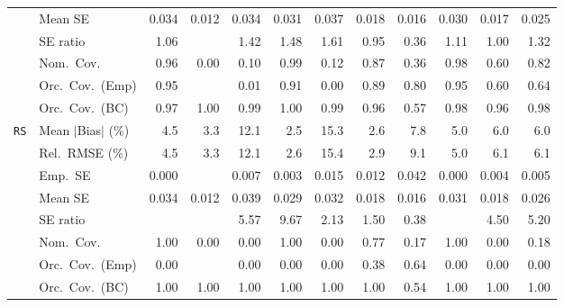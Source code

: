 \begin{landscape}
\begin{longtable}{llrrrrrrrrrr}
 & Mean SE & 0.034 & 0.012 & 0.034 & 0.031 & 0.037 & 0.018 & 0.016 & 0.030 & 0.017 & 0.025 \\
 & SE ratio & \cellcolor{rankthree}1.06 &  & 1.42 & 1.48 & 1.61 & \cellcolor{ranktwo}0.95 & 0.36 & 1.11 & \cellcolor{rankone}1.00 & 1.32 \\
 & Nom.\ Cov. & \cellcolor{rankone}0.96 & 0.00 & 0.10 & \cellcolor{rankthree}0.99 & 0.12 & 0.87 & 0.36 & \cellcolor{ranktwo}0.98 & 0.60 & 0.82 \\
 & Orc.\ Cov.\ (Emp) & \cellcolor{rankone}0.95 &  & 0.01 & \cellcolor{ranktwo}0.91 & 0.00 & \cellcolor{rankthree}0.89 & 0.80 & \cellcolor{rankone}0.95 & 0.60 & 0.64 \\
 & Orc.\ Cov.\ (BC) & \cellcolor{ranktwo}0.97 & 1.00 & 0.99 & 1.00 & 0.99 & \cellcolor{rankone}0.96 & 0.57 & \cellcolor{rankthree}0.98 & \cellcolor{rankone}0.96 & \cellcolor{rankthree}0.98 \\
\addlinespace[2pt]
\quad \texttt{RS} & Mean $|$Bias$|$ (\%) & 4.5 & \cellcolor{rankthree}3.3 & 12.1 & \cellcolor{rankone}2.5 & 15.3 & \cellcolor{ranktwo}2.6 & 7.8 & 5.0 & 6.0 & 6.0 \\
 & Rel.\ RMSE (\%) & 4.5 & \cellcolor{rankthree}3.3 & 12.1 & \cellcolor{rankone}2.6 & 15.4 & \cellcolor{ranktwo}2.9 & 9.1 & 5.0 & 6.1 & 6.1 \\
 & Emp.\ SE & 0.000 &  & 0.007 & 0.003 & 0.015 & 0.012 & 0.042 & 0.000 & 0.004 & 0.005 \\
 & Mean SE & 0.034 & 0.012 & 0.039 & 0.029 & 0.032 & 0.018 & 0.016 & 0.031 & 0.018 & 0.026 \\
 & SE ratio &  &  & 5.57 & 9.67 & \cellcolor{rankthree}2.13 & \cellcolor{rankone}1.50 & \cellcolor{ranktwo}0.38 &  & 4.50 & 5.20 \\
 & Nom.\ Cov. & \cellcolor{rankone}1.00 & 0.00 & 0.00 & \cellcolor{rankone}1.00 & 0.00 & \cellcolor{ranktwo}0.77 & 0.17 & \cellcolor{rankone}1.00 & 0.00 & \cellcolor{rankthree}0.18 \\
 & Orc.\ Cov.\ (Emp) & \cellcolor{rankthree}0.00 &  & \cellcolor{rankthree}0.00 & \cellcolor{rankthree}0.00 & \cellcolor{rankthree}0.00 & \cellcolor{ranktwo}0.38 & \cellcolor{rankone}0.64 & \cellcolor{rankthree}0.00 & \cellcolor{rankthree}0.00 & \cellcolor{rankthree}0.00 \\
 & Orc.\ Cov.\ (BC) & \cellcolor{rankone}1.00 & \cellcolor{rankone}1.00 & \cellcolor{rankone}1.00 & \cellcolor{rankone}1.00 & \cellcolor{rankone}1.00 & \cellcolor{rankone}1.00 & \cellcolor{ranktwo}0.54 & \cellcolor{rankone}1.00 & \cellcolor{rankone}1.00 & \cellcolor{rankone}1.00 \\

\end{longtable}
\end{landscape}
